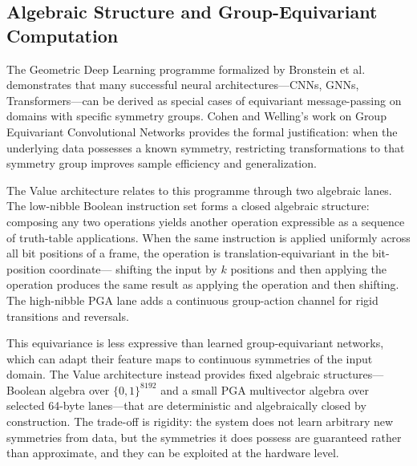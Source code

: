 \subsection{Algebraic Structure and Group-Equivariant Computation}
\label{sec:related_algebraic_topology}

The Geometric Deep Learning programme formalized by Bronstein et al.\
\citep{bronstein2021geometric} demonstrates that many successful neural
architectures---CNNs, GNNs, Transformers---can be derived as special
cases of equivariant message-passing on domains with specific symmetry
groups.  Cohen and Welling's work on Group Equivariant Convolutional
Networks \citep{cohen2016group} provides the formal justification: when
the underlying data possesses a known symmetry, restricting
transformations to that symmetry group improves sample efficiency and
generalization.

The Value architecture relates to this programme through two algebraic
lanes.  The low-nibble Boolean instruction set forms a closed algebraic
structure: composing any two operations yields another operation
expressible as a sequence of truth-table applications.  When the same
instruction is applied uniformly across all bit positions of a frame, the
operation is translation-equivariant in the bit-position coordinate---
shifting the input by $k$ positions and then applying the operation
produces the same result as applying the operation and then shifting.
The high-nibble PGA lane adds a continuous group-action channel for
rigid transitions and reversals.

This equivariance is less expressive than learned group-equivariant
networks, which can adapt their feature maps to continuous symmetries of
the input domain.  The Value architecture instead provides fixed
algebraic structures---Boolean algebra over $\{0,1\}^{8192}$ and a
small PGA multivector algebra over selected 64-byte lanes---that are
deterministic and algebraically closed by construction.  The trade-off
is rigidity: the system does not learn arbitrary new symmetries from
data, but the symmetries it does possess are guaranteed rather than
approximate, and they can be exploited at the hardware level.

